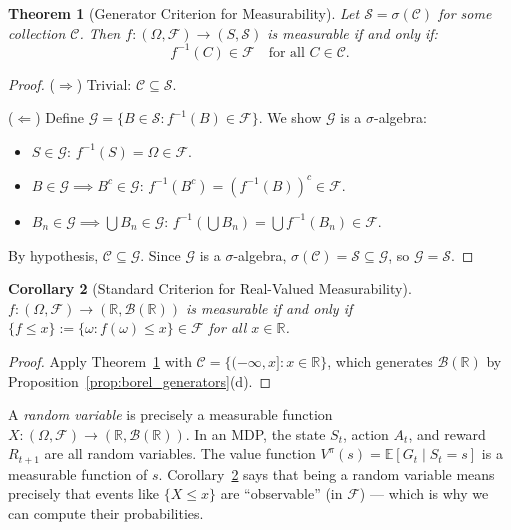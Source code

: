 \documentclass[11pt,a4paper]{article}
\theoremstyle{definition}
\theoremstyle{plain}
\newtheorem{theorem}{Theorem}[section]
\newtheorem{corollary}[theorem]{Corollary}
\theoremstyle{remark}
\newcommand{\R}{\mathbb{R}}
\newcommand{\E}{\mathbb{E}}
\newcommand{\Borel}{\mathcal{B}}
\begin{document}
\begin{theorem}[Generator Criterion for Measurability]
\label{thm:generator_criterion}
Let $\mathcal{S} = \sigma(\mathcal{C})$ for some collection $\mathcal{C}$. Then
$f: (\Omega, \mathcal{F}) \to (S, \mathcal{S})$ is measurable if and only if:
\begin{equation}
    f^{-1}(C) \in \mathcal{F} \quad \text{for all } C \in \mathcal{C}.
\end{equation}
\end{theorem}

\begin{proof}
($\Rightarrow$) Trivial: $\mathcal{C} \subseteq \mathcal{S}$.

($\Leftarrow$) Define $\mathcal{G} = \{B \in \mathcal{S} : f^{-1}(B) \in \mathcal{F}\}$. We show $\mathcal{G}$ is a $\sigma$-algebra:
\begin{itemize}[nosep]
    \item $S \in \mathcal{G}$: $f^{-1}(S) = \Omega \in \mathcal{F}$.
    \item $B \in \mathcal{G} \implies B^c \in \mathcal{G}$: $f^{-1}(B^c) = (f^{-1}(B))^c \in \mathcal{F}$.
    \item $B_n \in \mathcal{G} \implies \bigcup B_n \in \mathcal{G}$: $f^{-1}(\bigcup B_n) = \bigcup f^{-1}(B_n) \in \mathcal{F}$.
\end{itemize}
By hypothesis, $\mathcal{C} \subseteq \mathcal{G}$. Since $\mathcal{G}$ is a $\sigma$-algebra, $\sigma(\mathcal{C}) = \mathcal{S} \subseteq \mathcal{G}$, so $\mathcal{G} = \mathcal{S}$.
\end{proof}

\begin{corollary}[Standard Criterion for Real-Valued Measurability]
\label{cor:real_measurable}
$f: (\Omega, \mathcal{F}) \to (\R, \Borel(\R))$ is measurable if and only if
$\{f \leq x\} := \{\omega : f(\omega) \leq x\} \in \mathcal{F}$ for all $x \in \R$.
\end{corollary}

\begin{proof}
Apply Theorem~\ref{thm:generator_criterion} with $\mathcal{C} = \{(-\infty, x] : x \in \R\}$, which generates $\Borel(\R)$ by Proposition~\ref{prop:borel_generators}(d).
\end{proof}

\begin{rlconnection}[Connection to RL]
A \emph{random variable} is precisely a measurable function $X: (\Omega, \mathcal{F}) \to (\R, \Borel(\R))$. In an MDP, the state $S_t$, action $A_t$, and reward $R_{t+1}$ are all random variables. The value function $V^\pi(s) = \E[G_t \mid S_t = s]$ is a measurable function of $s$. Corollary~\ref{cor:real_measurable} says that being a random variable means precisely that events like $\{X \leq x\}$ are ``observable'' (in $\mathcal{F}$) --- which is why we can compute their probabilities.
\end{rlconnection}
\end{document}
